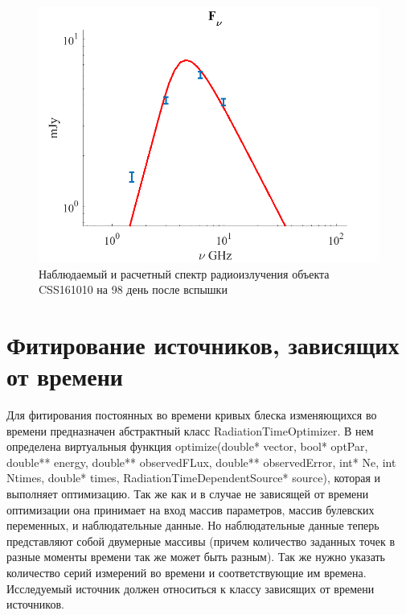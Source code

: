 \begin{figure}
	\centering
	\includegraphics[width=12.5 cm]{./fig/synchrotron1.png} 
	\caption{Наблюдаемый и расчетный спектр радиоизлучения объекта CSS161010 на 98 день после вспышки}
	\label{synchrotron1}
\end{figure}
\section{Фитирование источников, зависящих от времени}
Для фитирования постоянных во времени кривых блеска изменяющихся во времени предназначен абстрактный класс RadiationTimeOptimizer. В нем определена виртуальныя функция optimize(double* vector, bool* optPar, double** energy, double** observedFLux, double** observedError, int* Ne, int Ntimes, double* times, RadiationTimeDependentSource* source), которая и выполняет оптимизацию. Так же как и в случае не зависящей от времени оптимизации она принимает на вход массив параметров, массив булевских переменных, и наблюдательные данные. Но наблюдательные данные теперь представляют собой двумерные массивы (причем количество заданных точек в разные моменты времени так же может быть разным). Так же нужно указать количество серий измерений во времени и соответствующие им времена. Исследуемый источник должен относиться к классу зависящих от времени источников.

